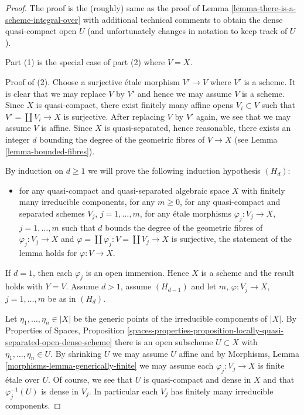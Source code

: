 \begin{proof}
The proof is the (roughly) same as the proof of
Lemma \ref{lemma-there-is-a-scheme-integral-over}
with additional technical comments to obtain
the dense quasi-compact open $U$ (and unfortunately
changes in notation to keep track of $U$).

\medskip\noindent
Part (1) is the special case of part (2) where $V = X$.

\medskip\noindent
Proof of (2). Choose a surjective \'etale morphism $V' \to V$
where $V'$ is a scheme. It is clear that we may replace $V$ by $V'$
and hence we may assume $V$ is a scheme. Since $X$ is quasi-compact,
there exist finitely many affine opens $V_i \subset V$ such that
$V' = \coprod V_i \to X$ is surjective.
After replacing $V$ by $V'$ again, we see that we may assume $V$ is affine.
Since $X$ is quasi-separated, hence reasonable, there exists an integer
$d$ bounding the degree of the geometric fibres of $V \to X$
(see Lemma \ref{lemma-bounded-fibres}).

\medskip\noindent
By induction on $d \geq 1$ we will prove the following induction
hypothesis $(H_d)$:
\begin{itemize}
\item for any quasi-compact and quasi-separated algebraic space
$X$ with finitely many irreducible components, for any $m \geq 0$,
for any quasi-compact and separated schemes $V_j$, $j = 1, \ldots, m$,
for any \'etale morphisms $\varphi_j : V_j \to X$, $j = 1, \ldots, m$
such that $d$ bounds the degree of the geometric fibres of
$\varphi_j : V_j\to X$ and
$\varphi = \coprod \varphi_j : V = \coprod V_j \to X$
is surjective, the statement of the lemma holds for $\varphi : V \to X$.
\end{itemize}
If $d = 1$, then each $\varphi_j$ is an open immersion. Hence $X$
is a scheme and the result holds with $Y = V$.
Assume $d > 1$, assume $(H_{d - 1})$ and let
$m$, $\varphi : V_j \to X$, $j = 1, \ldots, m$ be as in $(H_d)$.

\medskip\noindent
Let $\eta_1, \ldots, \eta_n \in |X|$ be the generic points of the
irreducible components of $|X|$. By
Properties of Spaces, Proposition
\ref{spaces-properties-proposition-locally-quasi-separated-open-dense-scheme}
there is an open subscheme $U \subset X$ with $\eta_1, \ldots, \eta_n \in U$.
By shrinking $U$ we may assume $U$ affine and by
Morphisms, Lemma \ref{morphisms-lemma-generically-finite}
we may assume each $\varphi_j : V_j \to X$ is finite \'etale over $U$.
Of course, we see that $U$ is quasi-compact and dense in $X$
and that $\varphi_j^{-1}(U)$ is dense in $V_j$. In particular each $V_j$
has finitely many irreducible components.


\end{proof}
